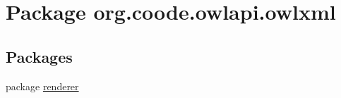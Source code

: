\hypertarget{namespaceorg_1_1coode_1_1owlapi_1_1owlxml}{\section{Package org.\-coode.\-owlapi.\-owlxml}
\label{namespaceorg_1_1coode_1_1owlapi_1_1owlxml}
}
\subsection*{Packages}
\begin{DoxyCompactItemize}
\item 
package \hyperlink{namespaceorg_1_1coode_1_1owlapi_1_1owlxml_1_1renderer}{renderer}
\end{DoxyCompactItemize}
